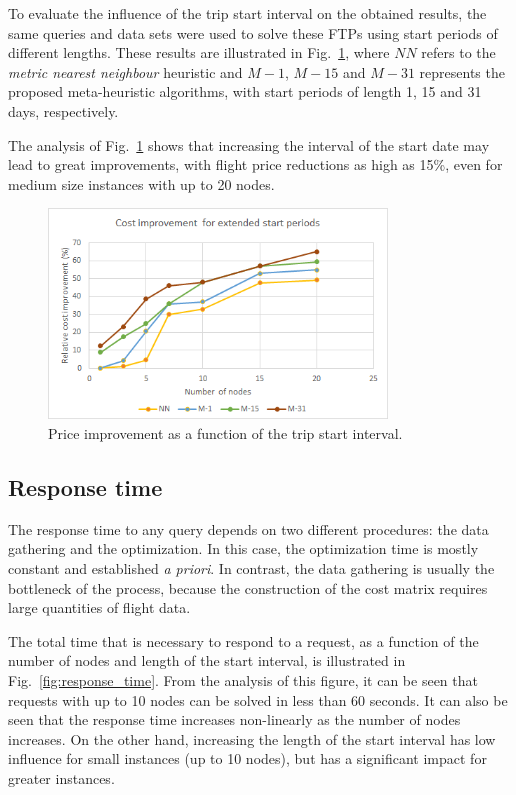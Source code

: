 To evaluate the influence of the trip start interval on the obtained results, the same queries and data sets were used to solve these FTPs using start periods of different lengths.
These results are illustrated in Fig.~\ref{fig:cost_vs_start_period}, where $NN$ refers to the \textit{metric nearest neighbour} heuristic and $M-1$, $M-15$ and $M-31$ represents the proposed meta-heuristic algorithms, with start periods of length 1, 15 and 31 days, respectively. 

The analysis of Fig.~\ref{fig:cost_vs_start_period} shows that increasing the interval of the start date may lead to great improvements, with flight price reductions as high as 15\%, even for medium size instances with up to 20 nodes.  

\begin{figure}
  \centering
  \includegraphics[width=9cm]{./imgs/cost_improvement_startdates.png}
  \caption{Price improvement as a function of the trip start interval.}
  \label{fig:cost_vs_start_period}  
\end{figure}


\subsection{Response time}
\label{sec:response_time}

The response time to any query depends on two different procedures: the data gathering and the optimization. In this case, the optimization time is mostly constant and established \textit{a priori}. In contrast, the data gathering is usually the bottleneck of the process, because the construction of the cost matrix requires large quantities of flight data. 

The total time that is necessary to respond to a request, as a function of the number of nodes and length of the start interval, is illustrated in Fig.~\ref{fig:response_time}. From the analysis of this figure, it can be seen that requests with up to 10 nodes can be solved in less than 60 seconds. It can also be seen that the response time increases non-linearly as the number of nodes increases. On the other hand, increasing the length of the start interval has low influence for small instances (up to 10 nodes), but has a significant impact for greater instances. 

